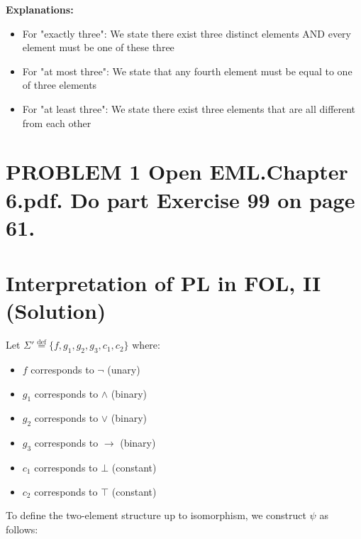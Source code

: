 \documentclass{article}
\newcommand{\defeq}{\stackrel{\text{def}}{=}}
\begin{document}
\textbf{Explanations:}
\begin{itemize}
    \item For "exactly three": We state there exist three distinct elements AND every element must be one of these three
    \item For "at most three": We state that any fourth element must be equal to one of three elements
    \item For "at least three": We state there exist three elements that are all different from each other
\end{itemize}

\vspace{1em}


\vspace{1em}

\newpage

\section*{PROBLEM 1 Open EML.Chapter 6.pdf. Do part Exercise 99 on page 61.}

\section*{Interpretation of PL in FOL, II (Solution)}

Let $\Sigma' \defeq \{f, g_1, g_2, g_3, c_1, c_2\}$ where:
\begin{itemize}
    \item $f$ corresponds to $\neg$ (unary)
    \item $g_1$ corresponds to $\land$ (binary)
    \item $g_2$ corresponds to $\lor$ (binary)
    \item $g_3$ corresponds to $\to$ (binary)
    \item $c_1$ corresponds to $\bot$ (constant)
    \item $c_2$ corresponds to $\top$ (constant)
\end{itemize}

To define the two-element structure up to isomorphism, we construct $\psi$ as follows:
\end{document}
